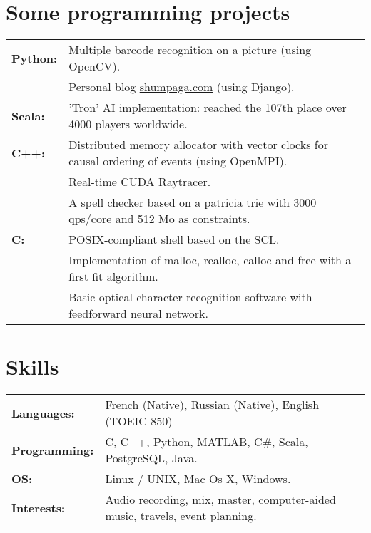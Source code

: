 \documentclass[11pt,a4paper,sans]{moderncv}
\begin{document}
\section{Some programming projects}
\setlength{\tabcolsep}{3pt}
\renewcommand{\arraystretch}{1.2}
\begin{tabular}{ll}
\textbf{Python:} & Multiple barcode recognition on a picture (using OpenCV).\\
& Personal blog \url{shumpaga.com} (using Django).\\
\textbf{Scala:} & 'Tron' AI implementation: reached the 107th place over 4000 players worldwide.\\
\textbf{C++:} & Distributed memory allocator with vector clocks for causal ordering of events (using OpenMPI).\\
& Real-time CUDA Raytracer.\\
& A spell checker based on a patricia trie with 3000 qps/core and 512 Mo as constraints.\\
\textbf{C:} & POSIX-compliant shell based on the SCL.\\
& Implementation of malloc, realloc, calloc and free with a first fit algorithm.\\
& Basic optical character recognition software with feedforward neural network.\\
\end{tabular}

\section{Skills}
\setlength{\tabcolsep}{3pt}
\renewcommand{\arraystretch}{1.2}
\begin{tabular}{ll}
\textbf{Languages:} & French (Native), Russian (Native), English (TOEIC 850)\\
\textbf{Programming:} & C, C++, Python, MATLAB, C\#, Scala, PostgreSQL, Java.\\
\textbf{OS:} & Linux / UNIX, Mac Os X, Windows.\\
\textbf{Interests:} & Audio recording, mix, master, computer-aided music, travels, event planning.
\end{tabular}
\end{document}
